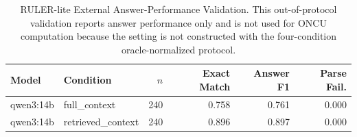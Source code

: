 \begin{table}[!t]
\renewcommand{\arraystretch}{1.10}
\caption{RULER-lite External Answer-Performance Validation. This out-of-protocol validation reports answer performance only and is not used for ONCU computation because the setting is not constructed with the four-condition oracle-normalized protocol.}
\label{tab:ruler_lite_external_validation}
\centering
\scriptsize
\setlength{\tabcolsep}{3pt}
\begin{tabular}{llrrrr}
\toprule
Model & Condition & $n$ & Exact Match & Answer F1 & Parse Fail. \\
\midrule
qwen3:14b & full\_context & 240 & 0.758 & 0.761 & 0.000 \\
qwen3:14b & retrieved\_context & 240 & 0.896 & 0.897 & 0.000 \\
\bottomrule
\end{tabular}
\end{table}
